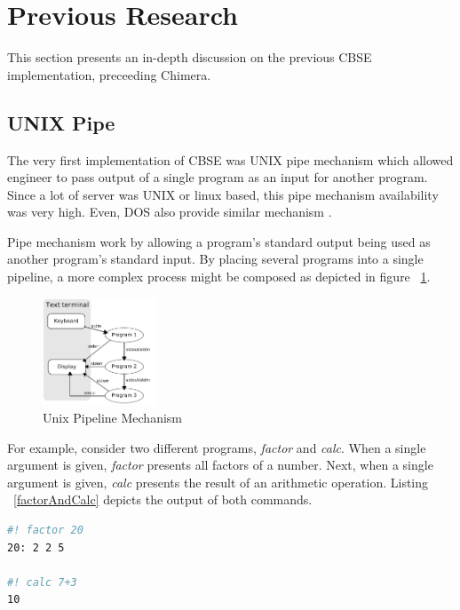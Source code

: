 \documentclass[conference]{IEEEtran}
\begin{document}
\section{Previous Research}

This section presents an in-depth discussion on the previous CBSE implementation,  
preceeding Chimera.


\subsection{UNIX Pipe}

The very first implementation of CBSE was UNIX pipe mechanism \cite{mcilroy1968mass} 
which allowed engineer to pass output of a single program as an input for 
another program. Since a lot of server was UNIX or linux based, this pipe 
mechanism availability was very high. Even, DOS also provide similar mechanism 
\cite{dos7command}.

Pipe mechanism work by allowing a program's standard output being used as another
program's standard input. By placing several programs into a single pipeline, 
a more complex process might be composed as depicted in figure ~\ref{fig:unixPipe}.

\begin{figure}
	\centering
	\includegraphics[width=0.3\textwidth]
		{images/Pipeline.jpg}
	\caption{Unix Pipeline Mechanism}
	\label{fig:unixPipe}
\end{figure}

For example, consider two different programs,
{\it factor} and {\it calc}. When a single argument is given, {\it factor} presents all 
factors of a number. Next, when a single argument is given, {\it calc} presents the result 
of an arithmetic operation. Listing ~\ref{factorAndCalc} depicts the output of both commands.

\begin{lstlisting}[caption=Usage of factor and calc, label=factorAndCalc, language=bash, basicstyle=\small, breaklines=true]
#! factor 20
20: 2 2 5

#! calc 7+3 
10
\end{lstlisting}
\end{document}
